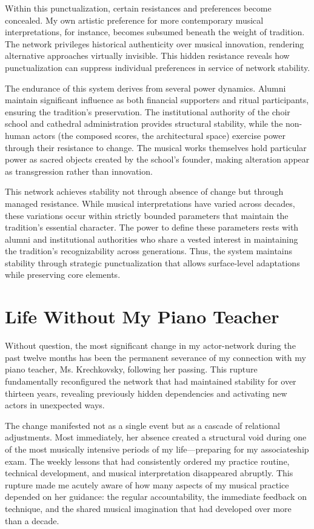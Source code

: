 \documentclass{article} %
\begin{document}
Within this punctualization, certain resistances and preferences become concealed. My own artistic preference for more contemporary musical interpretations, for instance, becomes subsumed beneath the weight of tradition. The network privileges historical authenticity over musical innovation, rendering alternative approaches virtually invisible. This hidden resistance reveals how punctualization can suppress individual preferences in service of network stability.

The endurance of this system derives from several power dynamics. Alumni maintain significant influence as both financial supporters and ritual participants, ensuring the tradition's preservation. The institutional authority of the choir school and cathedral administration provides structural stability, while the non-human actors (the composed scores, the architectural space) exercise power through their resistance to change. The musical works themselves hold particular power as sacred objects created by the school's founder, making alteration appear as transgression rather than innovation.

This network achieves stability not through absence of change but through managed resistance. While musical interpretations have varied across decades, these variations occur within strictly bounded parameters that maintain the tradition's essential character. The power to define these parameters rests with alumni and institutional authorities who share a vested interest in maintaining the tradition's recognizability across generations. Thus, the system maintains stability through strategic punctualization that allows surface-level adaptations while preserving core elements.

\section{Life Without My Piano Teacher}

Without question, the most significant change in my actor-network during the past twelve months has been the permanent severance of my connection with my piano teacher, Ms. Krechkovsky, following her passing. This rupture fundamentally reconfigured the network that had maintained stability for over thirteen years, revealing previously hidden dependencies and activating new actors in unexpected ways.

The change manifested not as a single event but as a cascade of relational adjustments. Most immediately, her absence created a structural void during one of the most musically intensive periods of my life—preparing for my associateship exam. The weekly lessons that had consistently ordered my practice routine, technical development, and musical interpretation disappeared abruptly. This rupture made me acutely aware of how many aspects of my musical practice depended on her guidance: the regular accountability, the immediate feedback on technique, and the shared musical imagination that had developed over more than a decade.
\end{document}
